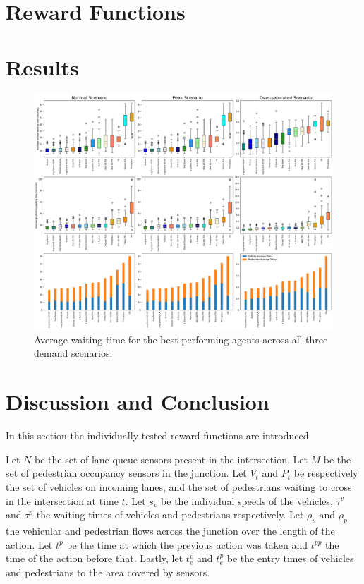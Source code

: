 \documentclass[conference]{IEEEtran}
\begin{document}
\section{Reward Functions}
\section{Results}
\begin{figure}                                                
\centering                                                    
\includegraphics[width=\textwidth]{9grid_ordered_boxplot_all.pdf}                                    
\caption{Average waiting time for the best performing agents across all three demand scenarios.}                                  
\label{results_9_grid}                                               
\end{figure}
\section{Discussion and Conclusion}

In this section the individually tested reward functions are introduced.

Let $N$ be the set of lane queue sensors present in the intersection.
Let $M$ be the set of pedestrian occupancy sensors in the junction.
Let $V_t$ and $P_t$ be respectively the set of vehicles on incoming lanes, and the set of pedestrians waiting to cross in the intersection at time $t$. 
Let $s_v$ be the individual speeds of the vehicles, $\tau^v$ and $\tau^p$ the waiting times of vehicles and pedestrians respectively.
Let $\rho_v$ and $\rho_p$ the vehicular and pedestrian flows across the junction over the length of the action.
Let $t^p$ be the time at which the previous action was taken and $t^{pp}$ the time of the action before that.
Lastly, let $t^v_e$ and $t^p_e$ be the entry times of vehicles and pedestrians to the area covered by sensors. 
\end{document}
